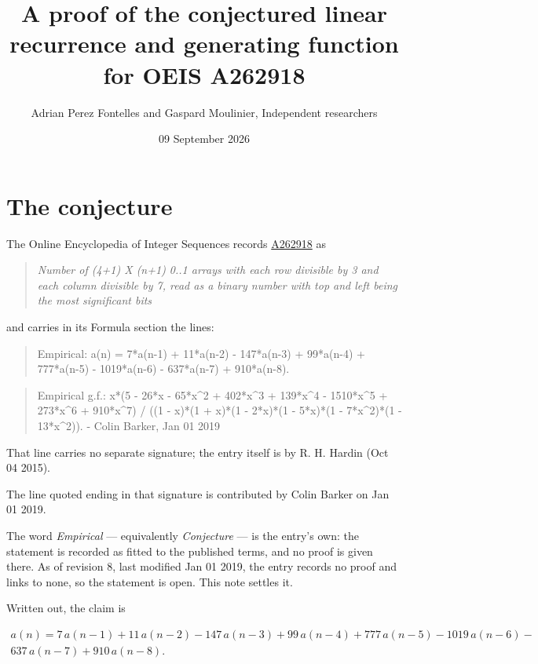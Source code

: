 \documentclass[11pt]{article}
\title{A proof of the conjectured linear recurrence and generating function for OEIS A262918}
\author{Adrian Perez Fontelles and Gaspard Moulinier, Independent researchers}
\date{09 September 2026}
\theoremstyle{definition}
\begin{document}
\maketitle
\section{The conjecture}

The Online Encyclopedia of Integer Sequences records \href{https://oeis.org/A262918}{A262918} as

\begin{quote}\itshape Number of (4+1) X (n+1) 0..1 arrays with each row divisible by 3 and each column divisible by 7, read as a binary number with top and left being the most significant bits\end{quote}

and carries in its Formula section the lines:

\begin{quote}\ttfamily Empirical: a(n) = 7*a(n-1) + 11*a(n-2) - 147*a(n-3) + 99*a(n-4) + 777*a(n-5) - 1019*a(n-6) - 637*a(n-7) + 910*a(n-8).\end{quote}

\begin{quote}\ttfamily Empirical g.f.: x*(5 - 26*x - 65*x\textasciicircum{}2 + 402*x\textasciicircum{}3 + 139*x\textasciicircum{}4 - 1510*x\textasciicircum{}5 + 273*x\textasciicircum{}6 + 910*x\textasciicircum{}7) / ((1 - x)*(1 + x)*(1 - 2*x)*(1 - 5*x)*(1 - 7*x\textasciicircum{}2)*(1 - 13*x\textasciicircum{}2)). - Colin Barker, Jan 01 2019\end{quote}

That line carries no separate signature; the entry itself is by R. H. Hardin (Oct 04 2015).

The line quoted ending in that signature is contributed by Colin Barker on Jan 01 2019.

The word {\itshape Empirical} --- equivalently {\itshape Conjecture} --- is the entry's own: the statement is recorded as fitted to the published terms, and no proof is given there. As of revision 8, last modified Jan 01 2019, the entry records no proof and links to none, so the statement is open. This note settles it.

Written out, the claim is

\begin{multline*} a(n) = 7\,a(n-1) + 11\,a(n-2) - 147\,a(n-3) + 99\,a(n-4) + 777\,a(n-5) - 1019\,a(n-6) - \\ 637\,a(n-7) + 910\,a(n-8). \end{multline*}
\end{document}
